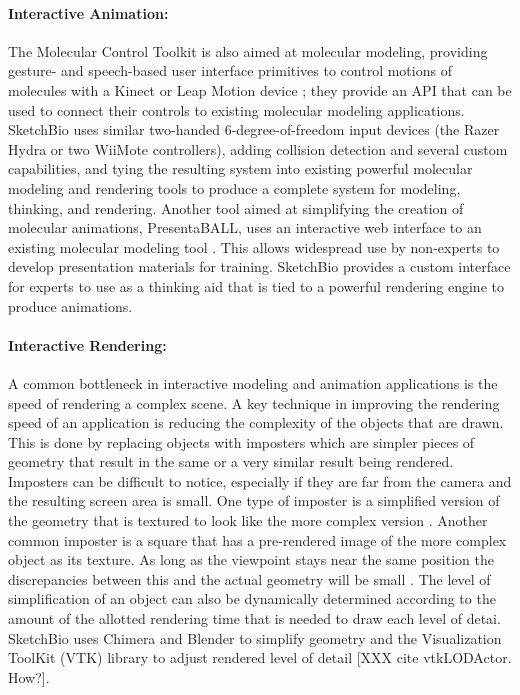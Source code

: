 \documentclass[twocolumn]{bmcart}%
\begin{document}
\paragraph*{Interactive Animation:}
The Molecular Control Toolkit \cite{sabirmolecular} is also aimed at molecular modeling, providing gesture- and speech-based user interface primitives to control motions of molecules with a Kinect or Leap Motion device \cite{sabirmolecular}; they provide an API that can be used to connect their controls to existing molecular modeling applications.  SketchBio uses similar two-handed 6-degree-of-freedom input devices (the Razer Hydra or two WiiMote controllers), adding collision detection and several custom capabilities, and tying the resulting system into existing powerful molecular modeling and rendering tools to produce a complete system for modeling, thinking, and rendering.  Another tool aimed at simplifying the creation of molecular animations, PresentaBALL\cite{nickelspresentaball}, uses an interactive web interface to an existing molecular modeling tool \cite{nickelspresentaball}.  This allows widespread use by non-experts to develop presentation materials for training.  SketchBio provides a custom interface for experts to use as a thinking aid that is tied to a powerful rendering engine to produce animations.

\paragraph*{Interactive Rendering:}
A common bottleneck in interactive modeling and animation applications is the speed of rendering a complex scene.  A key technique in improving the rendering speed of an application is reducing the complexity of the objects that are drawn.  This is done by replacing objects with imposters which are simpler pieces of geometry that result in the same or a very similar result being rendered.  Imposters can be difficult to notice, especially if they are far from the camera and the resulting screen area is small.  One type of imposter is a simplified version of the geometry that is textured to look like the more complex version \cite{decoret2003billboard}\cite{erikson1998simplification}\cite{cohen1998appearance}.  Another common imposter is a square that has a pre-rendered image of the more complex object as its texture.  As long as the viewpoint stays near the same position the discrepancies between this and the actual geometry will be small \cite{aliaga1996visualization}\cite{maciel1995visual}.  The level of simplification of an object can also be dynamically determined according to the amount of the allotted rendering time that is needed to draw each level of detai.  SketchBio uses Chimera and Blender to simplify geometry and the Visualization ToolKit (VTK) library to adjust rendered level of detail [XXX cite vtkLODActor.  How?].
\end{document}
